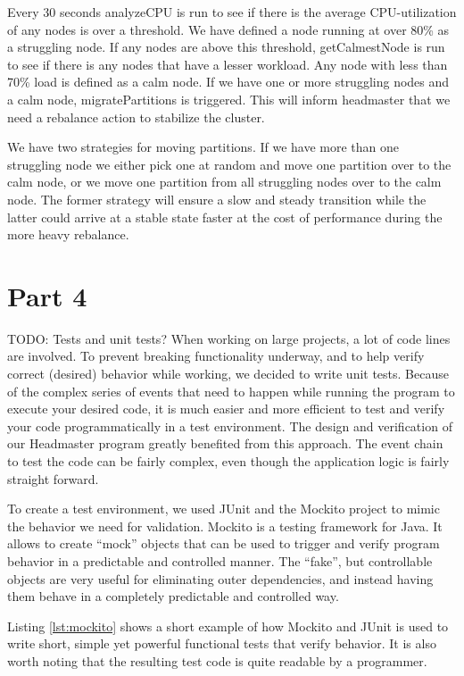Every 30 seconds analyzeCPU is run to see if there is the average CPU-utilization of any nodes is over a threshold. We have defined a node running at over 80\% as a struggling node. If any nodes are above this threshold, getCalmestNode is run to see if there is any nodes that have a lesser workload. Any node with less than 70\% load is defined as a calm node. If we have one or more struggling nodes and a calm node, migratePartitions is triggered. This will inform headmaster that we need a rebalance action to stabilize the cluster. 

We have two strategies for moving partitions. If we have more than one struggling node we either pick one at random and move one partition over to the calm node, or we move one partition from all struggling nodes over to the calm node. The former strategy will ensure a slow and steady transition while the latter could arrive at a stable state faster at the cost of performance during the more heavy rebalance.


\section{Part 4}
\label{sec:testing}
TODO: Tests and unit tests?
When working on large projects, a lot of code lines are involved. To prevent breaking functionality underway, and to help verify correct (desired) behavior while working, we decided to write unit tests. 
Because of the complex series of events that need to happen while running the program to execute your desired code, it is much easier and more efficient to test and verify your code programmatically in a test environment. The design and verification of our Headmaster program greatly benefited from this approach. The event chain to test the code can be fairly complex, even though the application logic is fairly straight forward.

To create a test environment, we used JUnit and the Mockito project to mimic the behavior we need for validation.
Mockito is a testing framework for Java. It allows to create ``mock'' objects that can be used to trigger and verify program behavior in a predictable and controlled manner. The ``fake'', but controllable objects are very useful for eliminating outer dependencies, and instead having them behave in a completely predictable and controlled way.

Listing \ref{lst:mockito} shows a short example of how Mockito and JUnit is used to write short, simple yet powerful functional tests that verify behavior. It is also worth noting that the resulting test code is quite readable by a programmer.

